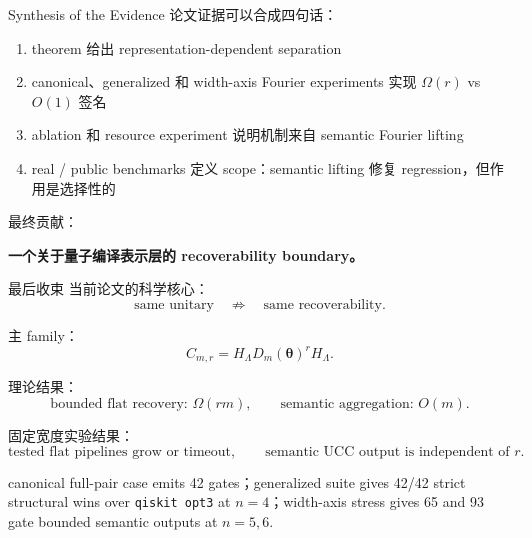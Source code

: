 \documentclass[aspectratio=169,11pt]{ctexbeamer}
\begin{document}
\begin{frame}{Synthesis of the Evidence}
  论文证据可以合成四句话：

  \begin{enumerate}
    \item theorem 给出 representation-dependent separation
    \item canonical、generalized 和 width-axis Fourier experiments 实现 $\Omega(r)$ vs $O(1)$ 签名
    \item ablation 和 resource experiment 说明机制来自 semantic Fourier lifting
    \item real / public benchmarks 定义 scope：semantic lifting 修复 regression，但作用是选择性的
  \end{enumerate}

  \vspace{0.8em}
  最终贡献：
  \begin{center}
    \Large
    \textbf{一个关于量子编译表示层的 recoverability boundary。}
  \end{center}
\end{frame}

\begin{frame}{最后收束}
  当前论文的科学核心：
  \[
    \text{same unitary}
    \quad\not\Rightarrow\quad
    \text{same recoverability}.
  \]

  主 family：
  \[
    C_{m,r}=H_{\Lambda}D_m(\bm{\theta})^rH_{\Lambda}.
  \]

  理论结果：
  \[
    \text{bounded flat recovery: }\Omega(rm),
    \qquad
    \text{semantic aggregation: }O(m).
  \]

  固定宽度实验结果：
  \[
    \text{tested flat pipelines grow or timeout},
    \qquad
    \text{semantic UCC output is independent of }r.
  \]

  \vspace{0.5em}
  canonical full-pair case emits 42 gates；generalized suite gives 42/42
  strict structural wins over \texttt{qiskit opt3} at $n=4$；width-axis stress
  gives 65 and 93 gate bounded semantic outputs at $n=5,6$.
\end{frame}
\end{document}

